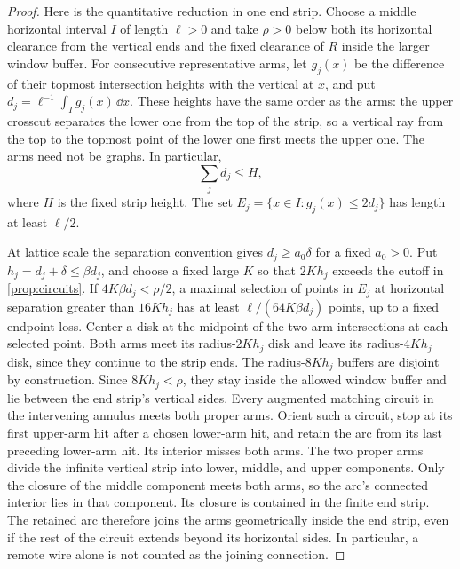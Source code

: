 \begin{proof}
Here is the quantitative reduction in one end strip. Choose a middle
horizontal interval $I$ of length $\ell>0$ and take $\rho>0$ below
both its horizontal clearance from the vertical ends and the fixed
clearance of $R$ inside the larger window buffer. For consecutive
representative arms, let $g_j(x)$ be the difference of their topmost
intersection heights with the vertical at $x$, and put
$d_j=\ell^{-1}\int_I g_j(x)\,\dd x$. These heights have the same
order as the arms: the upper crosscut separates the lower one from the
top of the strip, so a vertical ray from the top to the topmost point
of the lower one first meets the upper one. The arms need not be
graphs. In particular,
\begin{equation}\label{eq:spatial-gap-sum}
                  \sum_j d_j\le H,
\end{equation}
where $H$ is the fixed strip height. The set
$E_j=\{x\in I:g_j(x)\le2d_j\}$ has length at least $\ell/2$.

At lattice scale the separation convention gives $d_j\ge a_0\delta$
for a fixed $a_0>0$. Put $h_j=d_j+\delta\le\beta d_j$, and choose a
fixed large $K$ so that $2Kh_j$ exceeds the cutoff in
\cref{prop:circuits}. If $4K\beta d_j<\rho/2$, a maximal selection of
points in $E_j$ at horizontal separation greater than $16Kh_j$ has
at least $\ell/(64K\beta d_j)$ points, up to a fixed endpoint loss.
Center a disk at the midpoint of the two arm intersections at each
selected point. Both arms meet its radius-$2Kh_j$ disk and leave its
radius-$4Kh_j$ disk, since they continue to the strip ends. The
radius-$8Kh_j$ buffers are disjoint by construction. Since
$8Kh_j<\rho$, they stay inside the allowed window buffer and lie
between the end strip's vertical sides. Every augmented matching
circuit in the intervening annulus meets both proper arms. Orient such
a circuit, stop at its first upper-arm hit after a chosen lower-arm hit,
and retain the arc from
its last preceding lower-arm hit. Its interior misses both arms.
The two proper arms divide the infinite vertical strip into lower,
middle, and upper components. Only the closure of the middle component
meets both arms, so the arc's connected interior lies in that component.
Its closure is contained in the finite end strip. The retained arc
therefore joins the arms geometrically inside the end strip, even if
the rest of the circuit extends beyond its horizontal sides. In
particular, a remote wire alone is not counted as the joining connection.


\end{proof}
